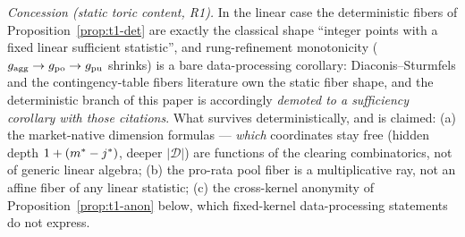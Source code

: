 \emph{Concession (static toric content, R1).} In the linear case the
deterministic fibers of Proposition~\ref{prop:t1-det} are exactly the
classical shape ``integer points with a fixed linear sufficient statistic'',
and rung-refinement monotonicity ($g_{\mathrm{agg}} \to g_{\mathrm{po}} \to g_{\mathrm{pu}}$ shrinks) is a
bare data-processing corollary: Diaconis--Sturmfels
\citep{diaconissturmfels1998} and the contingency-table fibers literature
\citep{fibers2014} own the static fiber shape, and the deterministic branch
of this paper is accordingly \emph{demoted to a sufficiency corollary with
those citations}. What survives deterministically, and is claimed: (a) the
market-native dimension formulas --- \emph{which} coordinates stay free
(hidden depth $1 + (m^{*} - j^{*})$, deeper $|\mathcal{D}|$) are functions of the
clearing combinatorics, not of generic linear algebra; (b) the pro-rata pool
fiber is a multiplicative ray, not an affine fiber of any linear statistic;
(c) the cross-kernel anonymity of Proposition~\ref{prop:t1-anon} below,
which fixed-kernel data-processing statements do not express.

